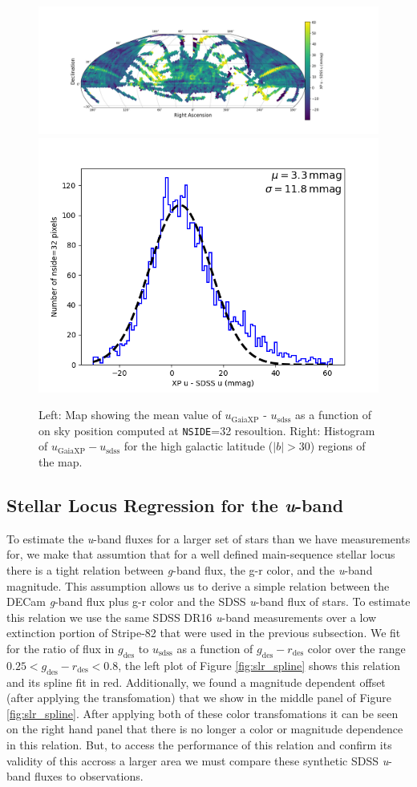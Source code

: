 \begin{figure}
    \includegraphics[width=0.64\linewidth]{./figures/u-band/uxp-usdss_full_map.png}
    \includegraphics[width=0.32\linewidth]{./figures/u-band/uxp-usdss_highglat_hist.png}
    \caption{Left: Map showing the mean value of $u_{\mathrm{GaiaXP}}$ - $u_{\mathrm{sdss}}$ as a function of on sky position computed at \texttt{NSIDE}=32 resoultion.  
    Right: Histogram of $u_{\mathrm{GaiaXP}} - u_{\mathrm{sdss}}$ for the high galactic latitude ($|b| > 30$) regions of the map.}
    \label{fig:sdss-gaiaxp-u}
\end{figure}



\subsection{Stellar Locus Regression for the \textit{u}-band}
\label{sec:slr}
To estimate the \textit{u}-band fluxes for a larger set of stars than we have measurements for, we make that assumtion that for a well defined main-sequence stellar locus there is a tight relation between \textit{g}-band flux, the g-r color, and the \textit{u}-band magnitude.
This assumption allows us to derive a simple relation between the DECam \textit{g}-band flux plus g-r color and the SDSS \textit{u}-band flux of stars. 
To estimate this relation we use the same SDSS DR16 \textit{u}-band measurements over a low extinction portion of Stripe-82 that were used in the previous subsection. 
We fit for the ratio of flux in $g_{\mathrm{des}}$ to $u_{\mathrm{sdss}}$ as a function of $g_{\mathrm{des}}-r_{\mathrm{des}}$ color over the range $0.25 <  g_{\mathrm{des}}-r_{\mathrm{des}} < 0.8$, the left plot of Figure \ref{fig:slr_spline} shows this relation and its spline fit in red. 
Additionally, we found a magnitude dependent offset (after applying the transfomation) that we show in the middle panel of Figure \ref{fig:slr_spline}. 
After applying both of these color transfomations it can be seen on the right hand panel that there is no longer a color or magnitude dependence in this relation. 
But, to access the performance of this relation and confirm its validity of this accross a larger area we must compare these synthetic SDSS \textit{u}-band fluxes to observations.

